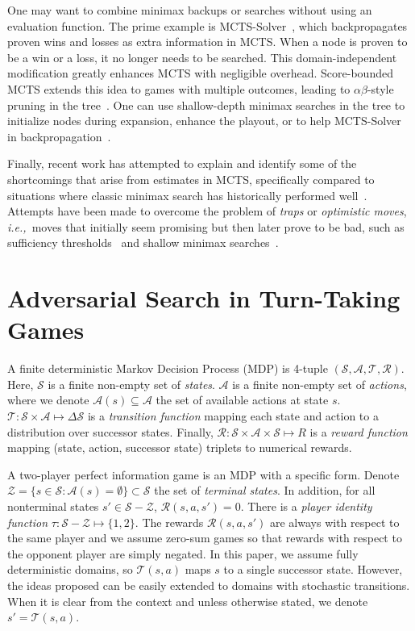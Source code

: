 \documentclass[conference]{IEEEtran}
\newcommand{\cA}{\mathcal{A}}
\newcommand{\cR}{\mathcal{R}}
\newcommand{\cS}{\mathcal{S}}
\newcommand{\cT}{\mathcal{T}}
\newcommand{\cZ}{\mathcal{Z}}
\newcommand{\ie}{{\it i.e.,}~}
\begin{document}
One may want to combine minimax backups or searches without using an evaluation function. 
The prime example is MCTS-Solver~\cite{Winands08Solver}, which backpropagates proven wins and losses as 
extra information in MCTS. When a node is proven to be a 
win or a loss, it no longer needs to be searched. This domain-independent modification greatly enhances 
MCTS with negligible overhead. Score-bounded MCTS extends this idea to games with multiple 
outcomes, leading to $\alpha \beta$-style pruning in the tree~\cite{Cazenave10Score}. One can use shallow-depth
minimax searches in the tree to initialize nodes during expansion, enhance the playout, or to help MCTS-Solver 
in backpropagation~\cite{Baier13MinimaxHybrids}.

Finally, recent work has attempted to explain and identify some of the shortcomings that arise from estimates in 
MCTS, specifically compared to situations where classic minimax search has historically performed 
well~\cite{Ramanujan10Understanding,Ramanujan10On}. 
Attempts have been made to overcome the problem of {\it traps} or {\it optimistic moves}, \ie moves that initially seem 
promising but then later prove to be bad, such as sufficiency 
thresholds~\cite{Gudmundsson13Sufficiency} and shallow minimax searches~\cite{Baier13MinimaxHybrids}. 


\section{Adversarial Search in Turn-Taking Games}

A finite deterministic Markov Decision Process (MDP) is 4-tuple $(\cS, \cA, \cT, \cR)$. Here, $\cS$ is a finite non-empty set of {\it states}. 
$\cA$ is a finite non-empty set of {\it actions}, where we denote $\cA(s) \subseteq \cA$ the set of available actions at state $s$. 
$\cT : \cS \times \cA \mapsto \Delta \cS$ is a {\it transition function} mapping 
each state and action to a distribution over successor states. Finally, $\cR : \cS \times \cA \times \cS \mapsto R$ 
is a {\it reward function} mapping (state, action, successor state) triplets to numerical rewards. 

A two-player perfect information game is an MDP with a specific form.
Denote $\cZ = \{ s \in \cS: \cA(s) = \emptyset \} \subset \cS$ the set of {\it terminal states}. 
In addition, for all nonterminal states $s' \in \cS - \cZ$, $\cR(s,a,s') = 0$. 
There is a {\it player identity function} $\tau : \cS - \cZ \mapsto \{1,2\}$. 
The rewards $\cR(s,a,s')$ are always with respect to the same player and  
we assume zero-sum games so that rewards with respect to the opponent player are simply negated. 
In this paper, we assume fully deterministic domains, so $\cT(s,a)$ maps $s$ to a single successor 
state. 
However, the ideas proposed can be easily extended to domains with stochastic transitions. 
When it is clear from the context and unless otherwise stated, we denote $s' = \cT(s,a)$. 
\end{document}
